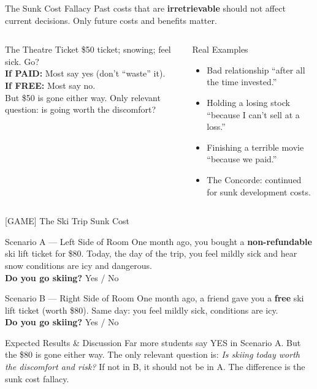 \documentclass[aspectratio=169]{beamer}
\begin{document}
\begin{frame}{The Sunk Cost Fallacy}
Past costs that are \textbf{irretrievable} should not affect current decisions. Only future costs and benefits matter.
\begin{columns}
\begin{alertblock}{The Theatre Ticket}
\$50 ticket; snowing; feel sick. Go?\\[0.2em]
\textbf{If PAID:} Most say yes (don't ``waste'' it).\\
\textbf{If FREE:} Most say no.\\[0.2em]
But \$50 is \alert{gone either way}. Only relevant question: is going worth the discomfort?
\end{alertblock}
\begin{exampleblock}{Real Examples}
\begin{itemize}\small
  \item Bad relationship ``after all the time invested.''
  \item Holding a losing stock ``because I can't sell at a loss.''
  \item Finishing a terrible movie ``because we paid.''
  \item The Concorde: continued for sunk development costs.
\end{itemize}
\end{exampleblock}
\end{columns}
\end{frame}

\begin{frame}{[GAME] The Ski Trip Sunk Cost}
\begin{alertblock}{Scenario A --- Left Side of Room}
\small One month ago, you bought a \textbf{non-refundable} ski lift ticket for \$80. Today, the day of the trip, you feel mildly sick and hear snow conditions are icy and dangerous.\\[0.2em]
\textbf{Do you go skiing?} Yes / No
\end{alertblock}
\begin{alertblock}{Scenario B --- Right Side of Room}
\small One month ago, a friend gave you a \textbf{free} ski lift ticket (worth \$80). Same day: you feel mildly sick, conditions are icy.\\[0.2em]
\textbf{Do you go skiing?} Yes / No
\end{alertblock}
\pause
\begin{block}{Expected Results \& Discussion}
\small Far more students say YES in Scenario A. But the \$80 is gone either way. The only relevant question is: \textit{Is skiing today worth the discomfort and risk?} If not in B, it should not be in A. The difference is the \alert{sunk cost fallacy}.
\end{block}
\end{frame}
\end{document}
